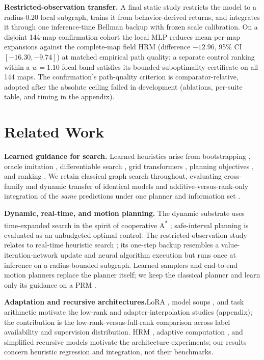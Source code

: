 \documentclass[letterpaper]{article} %
\begin{document}
\textbf{Restricted-observation transfer.} A final static study restricts the model to a radius-0.20 local subgraph, trains it from behavior-derived returns, and integrates it through one inference-time Bellman backup with frozen scale calibration. On a disjoint 144-map confirmation cohort the local MLP reduces mean per-map expansions against the complete-map field HRM (difference $-12.96$, 95\% CI $[-16.30,-9.74]$) at matched empirical path quality; a separate control ranking within a $w{=}1.10$ focal band satisfies its bounded-suboptimality certificate on all 144 maps. The confirmation's path-quality criterion is comparator-relative, adopted after the absolute ceiling failed in development (ablations, per-suite table, and timing in the appendix).
\section{Related Work}

 \textbf{Learned guidance for search.} Learned heuristics arise from bootstrapping \citep{arfaee2011bootstrap}, oracle imitation \citep{bhardwaj2017sail}, differentiable search \citep{yonetani2021neuralastar}, grid transformers \citep{kirilenko2023transpath}, planning objectives \citep{ferber2020neural}, and ranking \citep{chrestien2023rank}. We retain classical graph search throughout, evaluating cross-family and dynamic transfer of identical models and additive-versus-rank-only integration of the \emph{same} predictions under one planner and information set \citep{pohl1970,pearl1982semiadmissible,aine2016mha}.

 \textbf{Dynamic, real-time, and motion planning.} The dynamic substrate uses time-expanded search in the spirit of cooperative A\textsuperscript{*} \citep{silver2005cooperative}; safe-interval planning \citep{phillips2011sipp} is evaluated as an unbudgeted optimal control. The restricted-observation study relates to real-time heuristic search \citep{korf1990rta,koenig2006rtaa}; its one-step backup resembles a value-iteration-network update \citep{tamar2016vin,lee2018gppn} and neural algorithm execution \citep{velickovic2021nar} but runs once at inference on a radius-bounded subgraph. Learned samplers and end-to-end motion planners \citep{ichter2018sampling,qureshi2019mpnet} replace the planner itself; we keep the classical planner and learn only its guidance on a PRM \citep{kavraki1996prm}.

 \textbf{Adaptation and recursive architectures.}\hspace{0.25em}LoRA \citep{hu2021lora}, model soups \citep{wortsman2022soups}, and task arithmetic \citep{ilharco2022task} motivate the low-rank and adapter-interpolation studies (appendix); the contribution is the low-rank-versus-full-rank comparison across label availability and supervision distribution. HRM \citep{wang2025hrm}, adaptive computation \citep{graves2016act,banino2021pondernet}, and simplified recursive models \citep{jolicoeur2025trm} motivate the architecture experiments; our results concern heuristic regression and integration, not their benchmarks.
\end{document}
